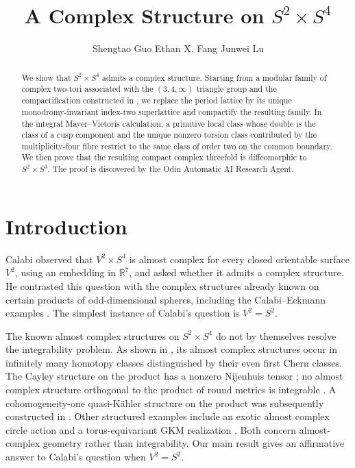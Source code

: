 \documentclass[11pt]{article}
\title{\normalfont\LARGE A Complex Structure on $S^2\times S^4$}%
\author{%
  Shengtao Guo \qquad
  Ethan X. Fang \qquad
  Junwei Lu
}
\date{}
\theoremstyle{definition}
\theoremstyle{remark}
\numberwithin{equation}{section}
\newcommand{\RR}{\mathbb R}
\begin{document}
\maketitle

\begin{abstract}
We show that $S^2\times S^4$ admits a complex structure. Starting from a modular family of complex
two-tori associated with the $(3,4,\infty)$ triangle group and the
compactification constructed in \citep{Alpoge2026}, we replace the period
lattice by its unique monodromy-invariant index-two superlattice and
compactify the resulting family.  In the integral Mayer--Vietoris
calculation, a primitive local class whose double is the class of a cusp
component and the unique nonzero torsion class contributed by the
multiplicity-four fibre restrict to the same class of order two on the
common boundary.  We then prove that the resulting compact complex
threefold is diffeomorphic to $S^2\times S^4$.
The proof is discovered by the Odin Automatic AI Research Agent.
\end{abstract}

\section{Introduction}\label{sec:introduction}

Calabi \citep{Calabi1958} observed that $V^2\times S^4$ is almost complex for every
closed orientable surface $V^2$, using an embedding in $\RR^7$, and
asked whether it admits a complex structure.  He contrasted this question
with the complex structures already known on certain products of
odd-dimensional spheres, including the Calabi--Eckmann examples
\citep{CalabiEckmann1953}.  The simplest instance of Calabi's question is
$V^2=S^2$.

The known almost complex structures on $S^2\times S^4$ do not by themselves
resolve the integrability problem.  As shown in
\citep[Example~5.4(2)]{GranjaMilivojevic2022}, its almost complex structures
occur in infinitely many homotopy classes distinguished by their even first
Chern classes.  The Cayley structure on the product has a nonzero
Nijenhuis tensor \citep[Section~6.2]{DaurtsevaSmolentsev2018}; no
almost complex structure orthogonal to the product of round metrics is
integrable \citep[Corollary~B]{EuhSekigawa2013}.  A cohomogeneity-one
quasi-K\"ahler structure on the product was subsequently constructed in
\citep[Theorem, p.~766]{Daurtseva2020}.
Other structured examples include an exotic almost complex circle action
\citep[Corollary~1.2]{KonstantisLindsay2025} and a torus-equivariant GKM
realization \citep[Section~8.2]{JangEtAl2026}.  Both concern
almost-complex geometry rather than integrability.  Our main result gives an
affirmative answer to Calabi's question when $V^2=S^2$.
\end{document}
